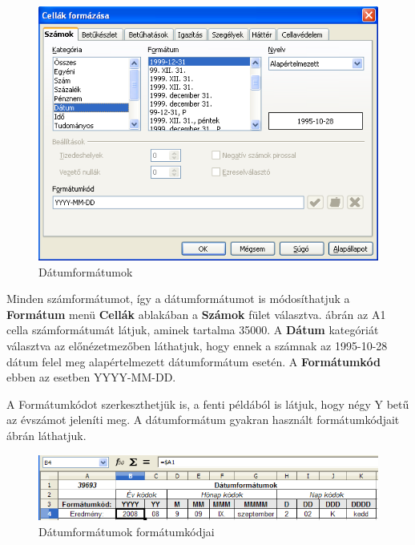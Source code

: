 \begin{figure}[!h]
\begin{center}
\includegraphics[width=13.944cm]{oocalcv1-img46.png}
\caption{Dátumformátumok}\label{Dátumformátumok}
\end{center}
\end{figure}

Minden számformátumot, így a dátumformátumot is
módosíthatjuk a \textbf{Formátum} menü \textbf{Cellák}
ablakában a \textbf{Számok} fület választva.  ábrán
az A1 cella számformátumát látjuk, aminek tartalma 35000. A
\textbf{Dátum} kategóriát választva az
előnézetmezőben láthatjuk, hogy ennek a  számnak az
1995-10-28 dátum felel meg alapértelmezett dátumformátum
esetén. A \textbf{Formátumkód} ebben az esetben YYYY-MM-DD.

A Formátumkódot szerkeszthetjük is, a fenti példából is
látjuk, hogy négy Y betű az évszámot jeleníti meg. A
dátumformátum gyakran használt formátumkódjait 
ábrán láthatjuk.

\begin{figure}[!h]
\begin{center}
\includegraphics[width=15.999cm]{oocalcv1-img47.png}
\caption{Dátumformátumok formátumkódjai}\label{DátumFormátumkódjai}
\end{center}
\end{figure}

